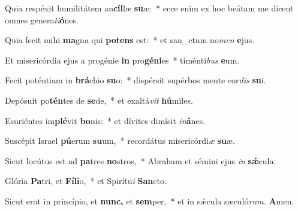 \item Quia respéxit humilitátem an\textbf{cíl}læ \textbf{su}æ:~* ecce enim ex hoc beátam me dicent omnes genera\tinyhspace\textit{ti}\textbf{ó}nes.
\item Quia fecit mihi \textbf{ma}gna qui \textbf{pot}\textbf{ens} est:~* et san\_ctum no\textit{men} \textbf{e}jus.
\item Et misericórdia ejus a progénie \textbf{in} pro\textbf{gé}\textbf{ni}es~* timénti\textit{bus} \textbf{e}um.
\item Fecit poténtiam in \textbf{brá}chio \textbf{su}o:~* dispérsit supérbos mente cor\textit{dis} \textbf{su}i.
\item Depósuit po\textbf{tén}tes de \textbf{se}de,~* et exaltá\textit{vit} \textbf{hú}miles.
\item Esuriéntes im\textbf{plé}vit \textbf{bo}nis:~* et dívites dimísit \textit{in}\textbf{á}nes.
\item Suscépit Israel \textbf{pú}erum \textbf{su}um,~* recordátus misericórdi\tinyhspace\textit{æ} \textbf{su}æ.
\item Sicut locútus est ad \textbf{pa}tres \textbf{no}stros,~* Abraham et sémini ejus \textit{in} \textbf{sǽ}cula.
\item Glória \textbf{Pa}tri, et \textbf{Fí}\textbf{li}o,~* et Spirítu\tinyhspace\textit{i} \textbf{San}cto.
\item Sicut erat in princípio, et \textbf{nunc,} et \textbf{sem}per,~* et in sǽcula sæculó\textit{rum.} \textbf{A}men.

